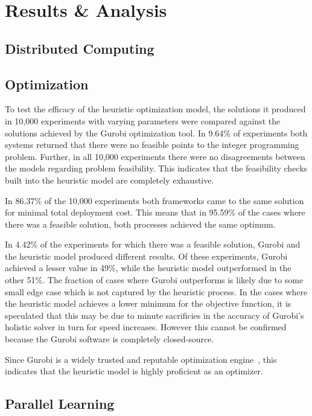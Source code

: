 \documentclass[../mthe-493-final-project.tex]{subfiles}
\begin{document}
    \chapter{Results \& Analysis}
    \label{ch:results-and-analysis}
    \section{Distributed Computing}
    
    \section{Optimization}
    
    To test the efficacy of the heuristic optimization model, the solutions it produced in 10,000 experiments with varying parameters were compared against the solutions achieved by the Gurobi optimization tool. In 9.64\% of experiments both systems returned that there were no feasible points to the integer programming problem. Further, in all 10,000 experiments there were no disagreements between the models regarding problem feasibility. This indicates that the feasibility checks built into the heuristic model are completely exhaustive.
    
    In 86.37\% of the 10,000 experiments both frameworks came to the same solution for minimal total deployment cost. This means that in 95.59\% of the cases where there was a feasible solution, both processes achieved the same optimum.
    
    In 4.42\% of the experiments for which there was a feasible solution, Gurobi and the heuristic model produced different results. Of these experiments, Gurobi achieved a lesser value in 49\%, while the heuristic model outperformed in the other 51\%. The fraction of cases where Gurobi outperforms is likely due to some small edge case which is not captured by the heuristic process. In the cases where the heuristic model achieves a lower minimum for the objective function, it is speculated that this may be due to minute sacrificies in the accuracy of Gurobi's holistic solver in turn for speed increases. However this cannot be confirmed because the Gurobi software is completely closed-source.
    
    Since Gurobi is a widely trusted and reputable optimization engine~\cite{gurobi}, this indicates that the heuristic model is highly proficient as an optimizer.
    
    
    \section{Parallel Learning}
\end{document}
